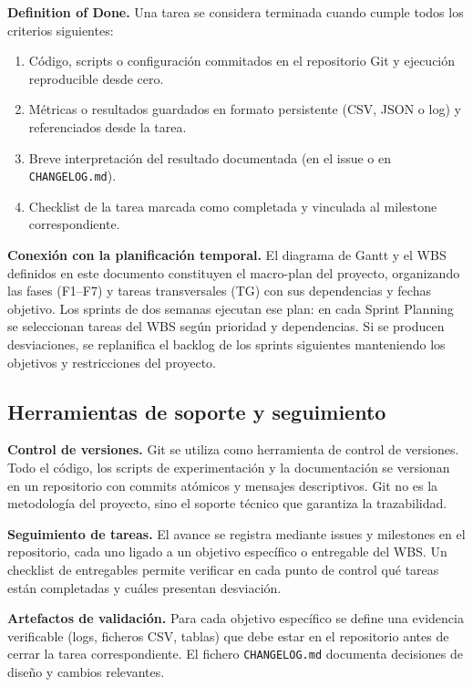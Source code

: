 \documentclass[11pt,a4paper]{article}
\begin{document}
\textbf{Definition of Done.} Una tarea se considera terminada cuando cumple todos los criterios siguientes:
\begin{enumerate}[nosep,leftmargin=*]
\item Código, scripts o configuración commitados en el repositorio Git y ejecución reproducible desde cero.
\item Métricas o resultados guardados en formato persistente (CSV, JSON o log) y referenciados desde la tarea.
\item Breve interpretación del resultado documentada (en el issue o en \texttt{CHANGELOG.md}).
\item Checklist de la tarea marcada como completada y vinculada al milestone correspondiente.
\end{enumerate}

\textbf{Conexión con la planificación temporal.} El diagrama de Gantt y el WBS definidos en este documento constituyen el macro-plan del proyecto, organizando las fases (F1--F7) y tareas transversales (TG) con sus dependencias y fechas objetivo. Los sprints de dos semanas ejecutan ese plan: en cada Sprint Planning se seleccionan tareas del WBS según prioridad y dependencias. Si se producen desviaciones, se replanifica el backlog de los sprints siguientes manteniendo los objetivos y restricciones del proyecto.

\subsection{Herramientas de soporte y seguimiento}

\textbf{Control de versiones.} Git se utiliza como herramienta de control de versiones. Todo el código, los scripts de experimentación y la documentación se versionan en un repositorio con commits atómicos y mensajes descriptivos. Git no es la metodología del proyecto, sino el soporte técnico que garantiza la trazabilidad.

\textbf{Seguimiento de tareas.} El avance se registra mediante issues y milestones en el repositorio, cada uno ligado a un objetivo específico o entregable del WBS. Un checklist de entregables permite verificar en cada punto de control qué tareas están completadas y cuáles presentan desviación.

\textbf{Artefactos de validación.} Para cada objetivo específico se define una evidencia verificable (logs, ficheros CSV, tablas) que debe estar en el repositorio antes de cerrar la tarea correspondiente. El fichero \texttt{CHANGELOG.md} documenta decisiones de diseño y cambios relevantes.
\end{document}
